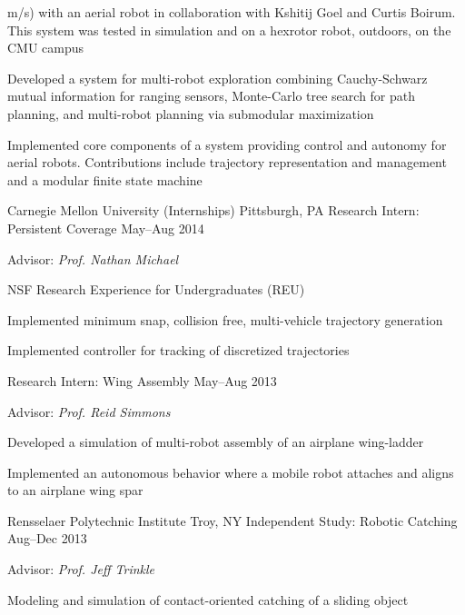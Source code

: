 \begin{cventries}
{\begin{cvitems}
      m/s) with an aerial robot in collaboration with Kshitij Goel and Curtis
      Boirum.
      This system was tested in simulation and on a hexrotor robot, outdoors, on
      the CMU campus
    \item Developed a system for multi-robot exploration combining Cauchy-Schwarz
      mutual information for ranging sensors, Monte-Carlo tree search for path
      planning, and multi-robot planning via submodular maximization
    \item Implemented core components of a system providing control and autonomy
      for aerial robots.
      Contributions include trajectory representation and management and a
      modular finite state machine
    \end{cvitems}
  }
  \cventrytwo
  {Carnegie Mellon University (Internships)}
  {Pittsburgh, PA}
  {Research Intern: Persistent Coverage}
  {May--Aug 2014}
  {
    Advisor: \emph{Prof. Nathan Michael}\linebreak
    \begin{cvitems}
    \item NSF Research Experience for Undergraduates (REU)
    \item Implemented minimum snap, collision free, multi-vehicle trajectory
      generation
    \item Implemented controller for tracking of discretized trajectories
    \end{cvitems}
  }
  {Research Intern: Wing Assembly}
  {May--Aug 2013}
  {
    Advisor: \emph{Prof. Reid Simmons}\linebreak
    \begin{cvitems}
    \item Developed a simulation of multi-robot assembly of an airplane wing-ladder
    \item Implemented an autonomous behavior where a mobile robot attaches and
      aligns to an airplane wing spar
    \end{cvitems}
  }
  \cventrytwo
  {Rensselaer Polytechnic Institute}
  {Troy, NY}
  {Independent Study: Robotic Catching}
  {Aug--Dec 2013}
  {
    Advisor: \emph{Prof. Jeff Trinkle}\linebreak
    \begin{cvitems}
    \item Modeling and simulation of contact-oriented catching of a sliding object

\end{cvitems}}
\end{cventries}
